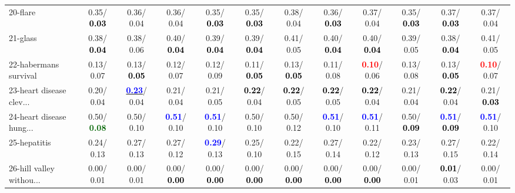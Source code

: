 \begin{table}[h]
\begin{center}
{\begin{tabular}{lc|c|c|c|c|c|c|c|c|c|c}
20-flare &   0.35/\textcolor{black}{\textbf{  0.03}} &   0.36/  0.04 &   0.36/  0.04 &   0.35/\textcolor{black}{\textbf{  0.03}} &   0.35/\textcolor{black}{\textbf{  0.03}} &   0.38/  0.04 &   0.36/\textcolor{black}{\textbf{  0.03}} &   0.37/  0.04 &   0.35/\textcolor{black}{\textbf{  0.03}} &   0.37/\textcolor{black}{\textbf{  0.03}} &   0.37/  0.04 \\
21-glass &   0.38/\textcolor{black}{\textbf{  0.04}} &   0.38/  0.06 &   0.40/\textcolor{black}{\textbf{  0.04}} &   0.39/\textcolor{black}{\textbf{  0.04}} &   0.39/\textcolor{black}{\textbf{  0.04}} &   0.41/  0.05 &   0.40/\textcolor{black}{\textbf{  0.04}} &   0.40/\textcolor{black}{\textbf{  0.04}} &   0.39/  0.05 &   0.38/\textcolor{black}{\textbf{  0.04}} &   0.41/  0.05 \\ \hline
22-habermans survival &   0.13/  0.07 &   0.13/\textcolor{black}{\textbf{  0.05}} &   0.12/  0.07 &   0.12/  0.09 &   0.11/\textcolor{black}{\textbf{  0.05}} &   0.13/\textcolor{black}{\textbf{  0.05}} &   0.11/  0.08 & \textcolor{red}{\textbf{  0.10}}/  0.06 &   0.13/  0.08 &   0.13/\textcolor{black}{\textbf{  0.05}} & \textcolor{red}{\textbf{  0.10}}/  0.07 \\
23-heart disease clev... &   0.20/  0.04 & \underline{\textcolor{blue}{\textbf{  0.23}}}/  0.04 &   0.21/  0.04 &   0.21/  0.05 & \textcolor{black}{\textbf{  0.22}}/  0.04 & \textcolor{black}{\textbf{  0.22}}/  0.05 & \textcolor{black}{\textbf{  0.22}}/  0.05 & \textcolor{black}{\textbf{  0.22}}/  0.04 &   0.21/  0.04 & \textcolor{black}{\textbf{  0.22}}/  0.04 &   0.21/\textcolor{black}{\textbf{  0.03}} \\
24-heart disease hung... &   0.50/\textcolor{darkgreen}{\textbf{  0.08}} &   0.50/  0.10 & \textcolor{blue}{\textbf{  0.51}}/  0.10 & \textcolor{blue}{\textbf{  0.51}}/  0.10 &   0.50/  0.10 &   0.50/  0.12 & \textcolor{blue}{\textbf{  0.51}}/  0.10 & \textcolor{blue}{\textbf{  0.51}}/  0.11 &   0.50/\textcolor{black}{\textbf{  0.09}} & \textcolor{blue}{\textbf{  0.51}}/\textcolor{black}{\textbf{  0.09}} & \textcolor{blue}{\textbf{  0.51}}/  0.10 \\
25-hepatitis &   0.24/  0.13 &   0.27/  0.13 &   0.27/  0.12 & \textcolor{blue}{\textbf{  0.29}}/  0.13 &   0.25/  0.10 &   0.22/  0.15 &   0.27/  0.14 &   0.22/  0.12 &   0.23/  0.13 &   0.27/  0.15 &   0.22/  0.14 \\
26-hill valley withou... &   0.00/  0.01 &   0.00/  0.01 &   0.00/\textcolor{black}{\textbf{  0.00}} &   0.00/\textcolor{black}{\textbf{  0.00}} &   0.00/\textcolor{black}{\textbf{  0.00}} &   0.00/\textcolor{black}{\textbf{  0.00}} &   0.00/\textcolor{black}{\textbf{  0.00}} &   0.00/\textcolor{black}{\textbf{  0.00}} &   0.00/  0.01 & \textcolor{black}{\textbf{  0.01}}/  0.03 &   0.00/  0.01 \\

\end{tabular}}
\end{center}
\end{table}
